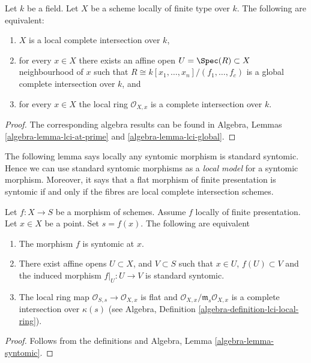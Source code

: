 \begin{lemma}
\label{lemma-local-complete-intersection}
Let $k$ be a field.
Let $X$ be a scheme locally of finite type over $k$.
The following are equivalent:
\begin{enumerate}
\item $X$ is a local complete intersection over $k$,
\item for every $x \in X$ there exists an affine open
$U = \Spec(R) \subset X$ neighbourhood of $x$
such that $R \cong k[x_1, \ldots, x_n]/(f_1, \ldots, f_c)$
is a global complete intersection over $k$, and
\item for every $x \in X$ the local ring $\mathcal{O}_{X, x}$
is a complete intersection over $k$.
\end{enumerate}
\end{lemma}

\begin{proof}
The corresponding algebra results can be found in
Algebra, Lemmas \ref{algebra-lemma-lci-at-prime} and
\ref{algebra-lemma-lci-global}.
\end{proof}

\noindent
The following lemma says locally any syntomic morphism is standard syntomic.
Hence we can use standard syntomic morphisms as a {\it local model}
for a syntomic morphism. Moreover, it says that a flat morphism of finite
presentation is syntomic if and only if the fibres are local complete
intersection schemes.

\begin{lemma}
\label{lemma-syntomic-locally-standard-syntomic}
Let $f : X  \to S$ be a morphism of schemes.
Assume $f$ locally of finite presentation.
Let $x \in X$ be a point.
Set $s = f(x)$.
The following are equivalent
\begin{enumerate}
\item The morphism $f$ is syntomic at $x$.
\item There exist affine opens $U \subset X$,
and $V \subset S$ such that $x \in U$, $f(U) \subset V$ and the
induced morphism $f|_U : U \to V$ is standard syntomic.
\item The local ring map $\mathcal{O}_{S, s} \to \mathcal{O}_{X, x}$
is flat and $\mathcal{O}_{X, x}/\mathfrak m_s \mathcal{O}_{X, x}$
is a complete intersection over $\kappa(s)$ (see
Algebra, Definition \ref{algebra-definition-lci-local-ring}).
\end{enumerate}
\end{lemma}

\begin{proof}
Follows from the definitions and
Algebra, Lemma \ref{algebra-lemma-syntomic}.
\end{proof}

